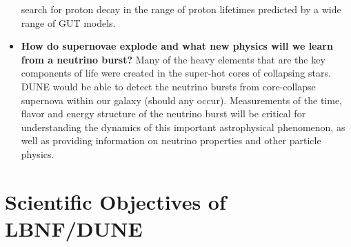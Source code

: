 \begin{itemize}
                search for proton decay in the range of proton lifetimes predicted by a wide range of GUT models.
   \item{\bf How do supernovae explode and what new physics will we learn from a neutrino burst?}
   Many of the heavy elements that are the key components of life were created in the super-hot cores of collapsing stars. DUNE would be able to detect the neutrino bursts from core-collapse supernova within our galaxy (should any occur). Measurements of the time, flavor and energy structure of the neutrino burst will be critical for understanding the dynamics of this important astrophysical phenomenon, as well as providing information on neutrino properties and other particle physics.
\end{itemize}

\section{Scientific Objectives of LBNF/DUNE}

